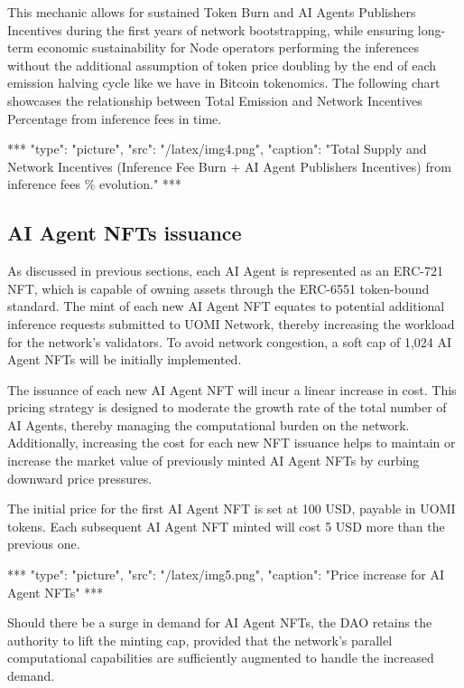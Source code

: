 \documentclass{article}
\begin{document}
This mechanic allows for sustained Token Burn and AI Agents Publishers Incentives during the first years of network bootstrapping, while ensuring long-term economic sustainability for Node operators performing the inferences without the additional assumption of token price doubling by the end of each emission halving cycle like we have in Bitcoin tokenomics. The following chart showcases the relationship between Total Emission and Network Incentives Percentage from inference fees in time.

***
"type": "picture",
"src": "/latex/img4.png",
"caption": "Total Supply and Network Incentives (Inference Fee Burn + AI Agent Publishers Incentives) from inference fees \% evolution."
***

\subsection{AI Agent NFTs issuance}

As discussed in previous sections, each AI Agent is represented as an ERC-721 NFT, which is capable of owning assets through the ERC-6551 token-bound standard. The mint of each new AI Agent NFT equates to potential additional inference requests submitted to UOMI Network, thereby increasing the workload for the network's validators. To avoid network congestion, a soft cap of 1,024 AI Agent NFTs will be initially implemented.

The issuance of each new AI Agent NFT will incur a linear increase in cost. This pricing strategy is designed to moderate the growth rate of the total number of AI Agents, thereby managing the computational burden on the network. Additionally, increasing the cost for each new NFT issuance helps to maintain or increase the market value of previously minted AI Agent NFTs by curbing downward price pressures.

The initial price for the first AI Agent NFT is set at 100 USD, payable in UOMI tokens. Each subsequent AI Agent NFT minted will cost 5 USD more than the previous one.



***
"type": "picture",
"src": "/latex/img5.png",
"caption": "Price increase for AI Agent NFTs"
***


Should there be a surge in demand for AI Agent NFTs, the DAO retains the authority to lift the minting cap, provided that the network's parallel computational capabilities are sufficiently augmented to handle the increased demand.
\end{document}
